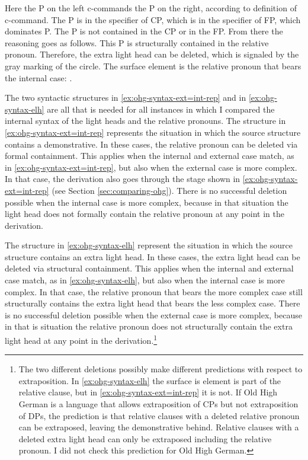Here the P on the left c-commands the P on the right, according to  definition of c-command.
The P is in the specifier of CP, which is in the specifier of FP, which dominates P. The P is not contained in the CP or in the FP.
From there the reasoning goes as follows.
This P is structurally contained in the relative pronoun. Therefore, the extra light head can be deleted, which is signaled by the gray marking of the circle.
The surface element is the relative pronoun that bears the internal case: .

The two syntactic structures in \ref{ex:ohg-syntax-ext=int-rep} and in \ref{ex:ohg-syntax-elh} are all that is needed for all instances in which I compared the internal syntax of the light heads and the relative pronouns.
The structure in \ref{ex:ohg-syntax-ext=int-rep} represents the situation in which the source structure contains a demonstrative. In these cases, the relative pronoun can be deleted via formal containment.
This applies when the internal and external case match, as in \ref{ex:ohg-syntax-ext=int-rep}, but also when the external case is more complex.
In that case, the derivation also goes through the stage shown in \ref{ex:ohg-syntax-ext=int-rep} (see Section \ref{sec:comparing-ohg}).
There is no successful deletion possible when the internal case is more complex, because in that situation the light head does not formally contain the relative pronoun at any point in the derivation.

The structure in \ref{ex:ohg-syntax-elh} represent the situation in which the source structure contains an extra light head. In these cases, the extra light head can be deleted via structural containment.
This applies when the internal and external case match, as in \ref{ex:ohg-syntax-elh}, but also when the internal case is more complex.
In that case, the relative pronoun that bears the more complex case still structurally contains the extra light head that bears the less complex case.
There is no successful deletion possible when the external case is more complex, because in that is situation the relative pronoun does not structurally contain the extra light head at any point in the derivation.\footnote{
The two different deletions possibly make different predictions with respect to extraposition. In \ref{ex:ohg-syntax-elh} the surface is element is part of the relative clause, but in \ref{ex:ohg-syntax-ext=int-rep} it is not. If Old High German is a language that allows extraposition of CPs but not extraposition of DPs, the prediction is that relative clauses with a deleted relative pronoun can be extraposed, leaving the demonstrative behind. Relative clauses with a deleted extra light head can only be extraposed including the relative pronoun. I did not check this prediction for Old High German.
}

